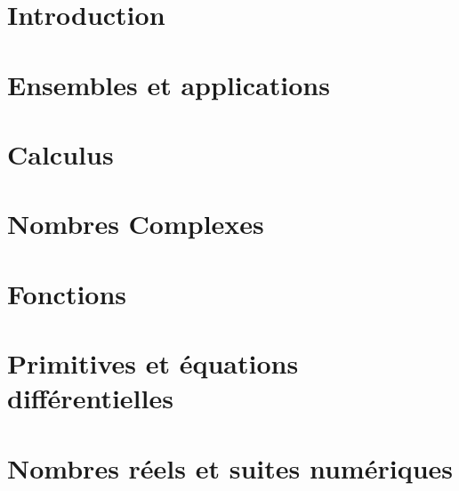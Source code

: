 \documentclass[a4paper, 10pt, twoside]{report}
\begin{document}
\setcounter{tocdepth}{2}
\renewcommand{\thefootnote}{\fnsymbol{footnote}}
\renewcommand{\contentsname}{Table des matières - Première année}
\setcounter{minitocdepth}{4}
\renewcommand{\mtctitle}{Contenu}
\dominitoc

\setcounter{chapter}{-1}

\theoremstyle{plain}




\chapter{Introduction}

    

\chapter{Ensembles et applications}

    

\chapter{Calculus}

    

\chapter{Nombres Complexes}

    
    
\chapter{Fonctions}

    
        
\chapter{Primitives et équations différentielles}

    

\chapter{Nombres réels et suites numériques}
\end{document}
